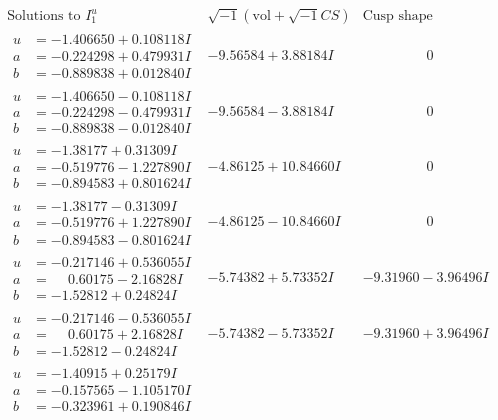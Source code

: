 \documentclass[1p]{elsarticle_modified}
\theoremstyle{definition}
\newcommand{\I}{\sqrt{-1}}
\begin{document}
$$\begin{array}{c|c|c}
\text{Solutions to }I^u_{1}& \I (\text{vol} + \sqrt{-1}CS) & \text{Cusp shape}\\
 \hline 
\begin{aligned}
u &= -1.406650 + 0.108118 I \\
a &= -0.224298 + 0.479931 I \\
b &= -0.889838 + 0.012840 I\end{aligned}
 & -9.56584 + 3.88184 I & \phantom{-0.000000 } 0 \\ \hline\begin{aligned}
u &= -1.406650 - 0.108118 I \\
a &= -0.224298 - 0.479931 I \\
b &= -0.889838 - 0.012840 I\end{aligned}
 & -9.56584 - 3.88184 I & \phantom{-0.000000 } 0 \\ \hline\begin{aligned}
u &= -1.38177 + 0.31309 I \\
a &= -0.519776 - 1.227890 I \\
b &= -0.894583 + 0.801624 I\end{aligned}
 & -4.86125 + 10.84660 I & \phantom{-0.000000 } 0 \\ \hline\begin{aligned}
u &= -1.38177 - 0.31309 I \\
a &= -0.519776 + 1.227890 I \\
b &= -0.894583 - 0.801624 I\end{aligned}
 & -4.86125 - 10.84660 I & \phantom{-0.000000 } 0 \\ \hline\begin{aligned}
u &= -0.217146 + 0.536055 I \\
a &= \phantom{-}0.60175 - 2.16828 I \\
b &= -1.52812 + 0.24824 I\end{aligned}
 & -5.74382 + 5.73352 I & -9.31960 - 3.96496 I \\ \hline\begin{aligned}
u &= -0.217146 - 0.536055 I \\
a &= \phantom{-}0.60175 + 2.16828 I \\
b &= -1.52812 - 0.24824 I\end{aligned}
 & -5.74382 - 5.73352 I & -9.31960 + 3.96496 I \\ \hline\begin{aligned}
u &= -1.40915 + 0.25179 I \\
a &= -0.157565 - 1.105170 I \\
b &= -0.323961 + 0.190846 I\end{aligned}

\end{array}$$
\end{document}
